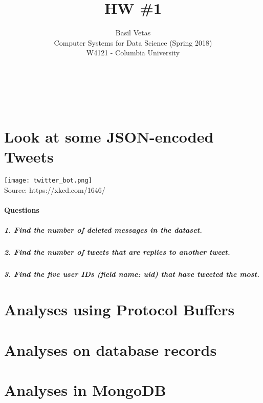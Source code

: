 \documentclass[12pt]{article}
\let\oldsection\section
\renewcommand\section{\clearpage\oldsection}
\begin{document}
 

\title{HW \#1}%
\author{Basil Vetas\\ %
Computer Systems for Data Science (Spring 2018)\\
W4121 - Columbia University} %
\maketitle
~~~~~~~~~~~~~~~~~~~~~~~~~~~~~~~~~~~~~~~~~~~~~~~~~~~~~~~~~~~~~~~~~~~~~~~~~~~~~

\section{Look at some JSON-encoded Tweets}

\texttt{[image: twitter\_bot.png]}
\\Source: https://xkcd.com/1646/

\paragraph{Questions}

\subparagraph{1. Find the number of deleted messages in the dataset.}
\subparagraph{2. Find the number of tweets that are replies to another tweet.}
\subparagraph{3. Find the five user IDs (field name: uid) that have tweeted the most.}

\section{Analyses using Protocol Buffers}



\section{Analyses on database records}



\section{Analyses in MongoDB}
\end{document}
